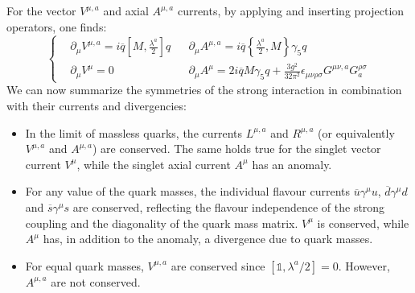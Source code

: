 \documentclass[../main.tex]{subfiles}
\begin{document}
For the vector $V^{\mu,a}$ and axial $A^{\mu,a}$ currents, by applying  and inserting projection operators, one finds:
\[
\left\{
\begin{aligned}
&\partial_\mu V^{\mu,a}=i\overline{q}\left[M,\frac{\lambda^a}{2}\right]q &&\partial_\mu A^{\mu,a}=i\overline{q}\left\{\frac{\lambda^a}{2},M\right\}\gamma_5q\\
&\partial_\mu V^\mu=0 
&&\partial_\mu A^\mu=2i\overline{q}M\gamma_5q+\frac{3g^2}{32\pi^2}\epsilon_{\mu\nu\rho\sigma}G^{\mu\nu,a}G^{\rho\sigma}_a
\end{aligned}
\right.
\]
We can now summarize the symmetries of the strong interaction in combination with their currents and divergencies:
\begin{itemize}
    \item In the limit of massless quarks, the currents $L^{\mu,a}$ and $R^{\mu,a}$ (or equivalently $V^{\mu,a}$ and $A^{\mu,a}$) are conserved. The same holds true for the singlet vector current $V^\mu$, while the singlet axial current $A^\mu$ has an anomaly.
    \item For any value of the quark masses, the individual flavour currents $\overline{u}\gamma^\mu u$, $\overline{d}\gamma^\mu d$ and $\overline{s}\gamma^\mu s$ are conserved, reflecting the flavour independence of the strong coupling and the diagonality of the quark mass matrix. $V^\mu$ is conserved, while $A^\mu$ has, in addition to the anomaly, a divergence due to quark masses.
    \item For equal quark masses, $V^{\mu,a}$ are conserved since $[\mathbb{1},\lambda^a/2]=0$. However, $A^{\mu,a}$ are not conserved.
\end{itemize}
\end{document}
